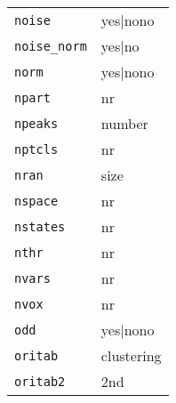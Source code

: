\documentclass[review]{elsarticle}
\begin{document}
\begin{tabular}{ll}
\texttt{noise}&{yes|no{no}}\\
\texttt{noise\_norm}&{yes|no}\\
\texttt{norm}&{yes|no{no}}\\
\texttt{npart}&{nr}\\
\texttt{npeaks}&{number}\\
\texttt{nptcls}&{nr}\\
\texttt{nran}&{size}\\
\texttt{nspace}&{nr}\\
\texttt{nstates}&{nr}\\
\texttt{nthr}&{nr}\\
\texttt{nvars}&{nr}\\
\texttt{nvox}&{nr}\\
\texttt{odd}&{yes|no{no}}\\
\texttt{oritab}&{clustering}\\
\texttt{oritab2}&{2nd}\\
\end{tabular}
\end{document}
